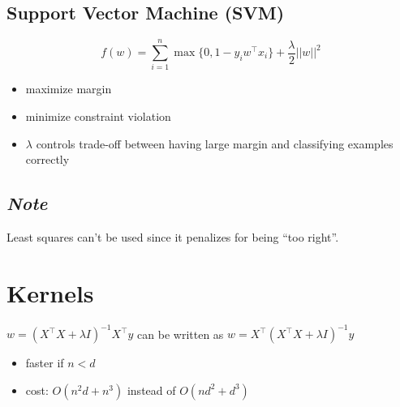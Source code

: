 \documentclass[10pt,landscape,a4paper]{article}
\begin{document}
\begin{multicols*}{5}
\subsection{Support Vector Machine (SVM)}
\begin{dmath*}
    f(w)=\sum_{i=1}^{n}\max{\{0,1-y_i w^\intercal x_i\}} + \frac{\lambda}{2}||w||^2
\end{dmath*}
\begin{itemize}
    \item maximize margin
    \item minimize constraint violation
    \item \(\lambda  \) controls trade-off between having large margin and classifying examples correctly
\end{itemize}

\subsection{\emph{Note}}
Least squares can't be used since it penalizes for being ``too right''.

\section{Kernels}
\(w = (X^\intercal X + \lambda I)^{-1} X^\intercal y\) can be written as \(w = X^\intercal (X^\intercal X + \lambda I)^{-1} y\)
\begin{itemize}
    \item faster if \(n < d\)
    \item cost: \(O(n^2d + n^3)\) instead of \(O(nd^2 + d^3)\)
\end{itemize}


\end{multicols*}
\end{document}
